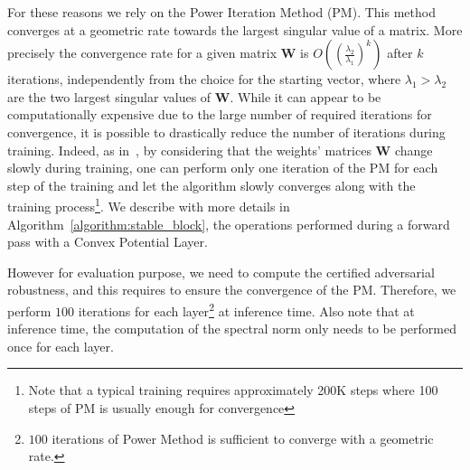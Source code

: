 For these reasons we rely on the Power Iteration Method (PM).  This method converges at a geometric rate towards the largest singular value of a matrix. More precisely the convergence rate for a given matrix $\mathbf{W}$ is $\textstyle O((\frac{\lambda_2}{\lambda_1})^k)$ after $k$ iterations, independently from the choice for the starting vector, where $\lambda_1>\lambda_2$ are the two largest singular values of $\mathbf{W}$. While it can appear to be computationally expensive due to the large number of required iterations for convergence, it is possible to drastically reduce the number of iterations during training. Indeed, as in~\citep{miyato2018spectral}, by considering that the weights' matrices $\mathbf{W}$ change slowly during training, one can perform only one iteration of the PM for each step of the training and let the algorithm slowly converges along with the training process\footnote{Note that a typical training requires approximately 200K steps where 100 steps of PM is usually enough for convergence}.
We describe with more details in Algorithm~\ref{algorithm:stable_block}, the operations performed during a forward pass with a Convex Potential Layer. 

However for evaluation purpose, we need to compute the certified adversarial robustness, and this requires to ensure the convergence of the PM. Therefore, we perform $100$ iterations for each layer\footnote{$100$ iterations of Power Method is sufficient to converge with a geometric rate.} at inference time. Also note that at inference time, the computation of the spectral norm only needs to be performed once for each layer. 


